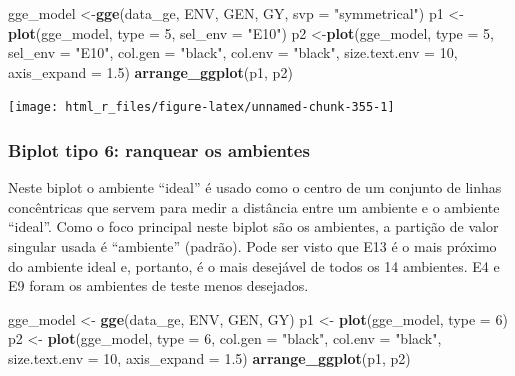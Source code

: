 \documentclass[
]{book}
\newenvironment{Shaded}{\begin{snugshade}}{\end{snugshade}}
\newcommand{\DataTypeTok}[1]{\textcolor[rgb]{0.13,0.29,0.53}{#1}}
\newcommand{\DecValTok}[1]{\textcolor[rgb]{0.00,0.00,0.81}{#1}}
\newcommand{\FloatTok}[1]{\textcolor[rgb]{0.00,0.00,0.81}{#1}}
\newcommand{\KeywordTok}[1]{\textcolor[rgb]{0.13,0.29,0.53}{\textbf{#1}}}
\newcommand{\NormalTok}[1]{#1}
\newcommand{\StringTok}[1]{\textcolor[rgb]{0.31,0.60,0.02}{#1}}
\begin{document}
\begin{Shaded}
\begin{Highlighting}[]
\NormalTok{gge_model <-}\KeywordTok{gge}\NormalTok{(data_ge, ENV, GEN, GY, }\DataTypeTok{svp =} \StringTok{"symmetrical"}\NormalTok{)}
\NormalTok{p1 <-}\KeywordTok{plot}\NormalTok{(gge_model, }\DataTypeTok{type =} \DecValTok{5}\NormalTok{, }\DataTypeTok{sel_env =} \StringTok{"E10"}\NormalTok{)}
\NormalTok{p2 <-}\KeywordTok{plot}\NormalTok{(gge_model,}
          \DataTypeTok{type =} \DecValTok{5}\NormalTok{,}
          \DataTypeTok{sel_env =} \StringTok{"E10"}\NormalTok{,}
          \DataTypeTok{col.gen =} \StringTok{"black"}\NormalTok{,}
          \DataTypeTok{col.env =} \StringTok{"black"}\NormalTok{,}
          \DataTypeTok{size.text.env =} \DecValTok{10}\NormalTok{,}
          \DataTypeTok{axis_expand =} \FloatTok{1.5}\NormalTok{)}
\KeywordTok{arrange_ggplot}\NormalTok{(p1, p2)}
\end{Highlighting}
\end{Shaded}

\begin{center}\texttt{[image: html\_r\_files/figure-latex/unnamed-chunk-355-1]} \end{center}

\hypertarget{biplot-tipo-6-ranquear-os-ambientes}{%
\subsubsection{Biplot tipo 6: ranquear os ambientes}\label{biplot-tipo-6-ranquear-os-ambientes}}

Neste biplot o ambiente ``ideal'' é usado como o centro de um conjunto de linhas concêntricas que servem para medir a distância entre um ambiente e o ambiente ``ideal''. Como o foco principal neste biplot são os ambientes, a partição de valor singular usada é ``ambiente'' (padrão). Pode ser visto que E13 é o mais próximo do ambiente ideal e, portanto, é o mais desejável de todos os 14 ambientes. E4 e E9 foram os ambientes de teste menos desejados.

\begin{Shaded}
\begin{Highlighting}[]
\NormalTok{gge_model <-}\StringTok{ }\KeywordTok{gge}\NormalTok{(data_ge, ENV, GEN, GY)}
\NormalTok{p1 <-}\StringTok{ }\KeywordTok{plot}\NormalTok{(gge_model, }\DataTypeTok{type =} \DecValTok{6}\NormalTok{)}
\NormalTok{p2 <-}\StringTok{ }\KeywordTok{plot}\NormalTok{(gge_model,}
           \DataTypeTok{type =} \DecValTok{6}\NormalTok{,}
           \DataTypeTok{col.gen =} \StringTok{"black"}\NormalTok{,}
           \DataTypeTok{col.env =} \StringTok{"black"}\NormalTok{,}
           \DataTypeTok{size.text.env =} \DecValTok{10}\NormalTok{,}
           \DataTypeTok{axis_expand =} \FloatTok{1.5}\NormalTok{)}
\KeywordTok{arrange_ggplot}\NormalTok{(p1, p2)}
\end{Highlighting}
\end{Shaded}
\end{document}
